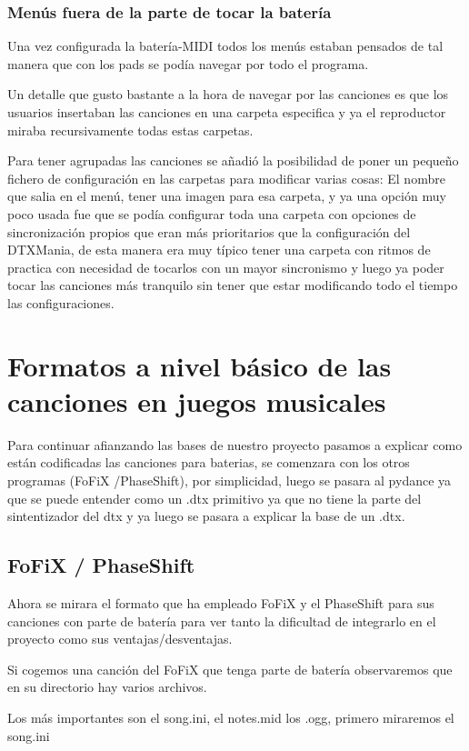 \documentclass[a4paper,11pt,oneside]{book}
\begin{document}
\subsubsection{Menús fuera de la parte de tocar la batería}
Una vez configurada la batería-MIDI todos los menús estaban pensados de tal manera que con los pads se podía navegar por todo el programa.


Un detalle que gusto bastante a la hora de navegar por las canciones es que los usuarios insertaban las canciones en una carpeta especifica y ya el reproductor miraba recursivamente todas estas carpetas.

Para tener agrupadas las canciones se añadió la posibilidad de poner un pequeño fichero de configuración en las carpetas para modificar varias cosas:
El nombre que salia en el menú, tener una imagen para esa carpeta, y ya una opción muy poco usada fue que se podía configurar toda una carpeta con opciones de sincronización propios que eran más prioritarios que la configuración del DTXMania, de esta manera era muy típico tener una carpeta con ritmos de practica con necesidad de tocarlos con un mayor sincronismo y luego ya poder tocar las canciones más tranquilo sin tener que estar modificando todo el tiempo las configuraciones.

\section{Formatos a nivel básico de las canciones en juegos musicales}
Para continuar afianzando las bases de nuestro proyecto pasamos a explicar como están codificadas las canciones para baterias, se comenzara con los otros programas (FoFiX /PhaseShift), por simplicidad, luego se pasara al pydance ya que se puede entender como un .dtx primitivo ya que no tiene la parte del sintentizador del dtx y ya luego se pasara a explicar la base de un .dtx.

\subsection{FoFiX / PhaseShift}

Ahora se mirara el formato que ha empleado FoFiX y el PhaseShift para sus canciones con parte de batería para ver tanto la dificultad de integrarlo en el proyecto como sus ventajas/desventajas.

Si cogemos una canción del FoFiX que tenga parte de batería observaremos que en su directorio hay varios archivos.

Los más importantes son el song.ini, el notes.mid los .ogg, primero miraremos el song.ini
\end{document}
